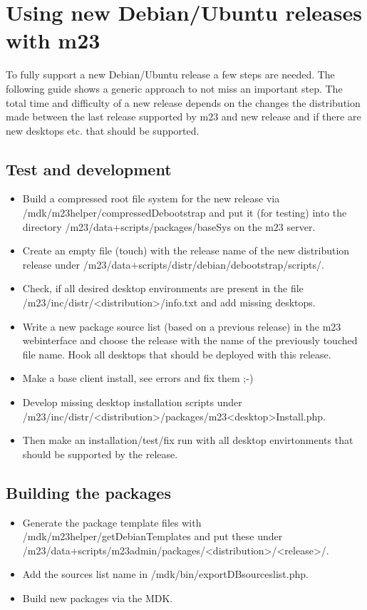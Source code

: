 \section{Using new Debian/Ubuntu releases with m23}
To fully support a new Debian/Ubuntu release a few steps are needed. The following guide shows a generic approach to not miss an important step. The total time and difficulty of a new release depends on the changes the distribution made between the last release supported by m23 and new release and if there are new desktops etc. that should be supported.

\subsection{Test and development}
\begin{itemize}
\item Build a compressed root file system for the new release via /mdk/m23helper/compressedDebootstrap and put it (for testing) into the directory /m23/data+scripts/packages/baseSys on the m23 server.

\item Create an empty file (touch) with the release name of the new distribution release under /m23/data+scripts/distr/debian/debootstrap/scripts/.

\item Check, if all desired desktop environments are present in the file /m23/inc/distr/<distribution>/info.txt and add missing desktops.

\item Write a new package source list (based on a previous release) in the m23 webinterface and choose the release with the name of the previously touched file name. Hook all desktops that should be deployed with this release.

\item Make a base client install, see errors and fix them ;-)

\item Develop missing desktop installation scripts under /m23/inc/distr/<distribution>/packages/m23<desktop>Install.php.

\item Then make an installation/test/fix run with all desktop envirtonments that should be supported by the release.
\end{itemize}



\subsection{Building the packages}
\begin{itemize}
\item Generate the package template files with /mdk/m23helper/getDebianTemplates and put these under /m23/data+scripts/m23admin/packages/<distribution>/<release>/.

\item Add the sources list name in /mdk/bin/exportDBsourceslist.php.

\item Build new packages via the MDK.
\end{itemize}